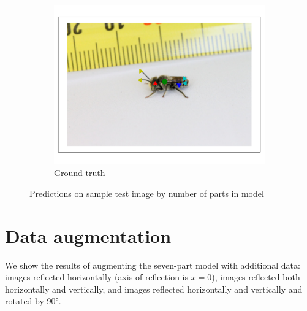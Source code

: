 \documentclass[11pt, oneside]{report}
\begin{document}
\begin{figure}[p]
\begin{subfigure}[b]{0.45\textwidth}
                \centering
                \includegraphics[width=\textwidth]{7pgt_3.pdf}
                \caption{Ground truth}
            \end{subfigure}
            \hspace{0.1\textwidth}\hspace{0.1\textwidth}
            \caption{Predictions on sample test image by number of parts in model}
            \label{fig:37_vis3}
        \end{figure}

    \section{Data augmentation}
        We show the results of augmenting the seven-part model with additional data: images reflected horizontally (axis of reflection is $x=0$), images reflected both horizontally and vertically, and images reflected horizontally and vertically and rotated by 90°.
\end{document}
